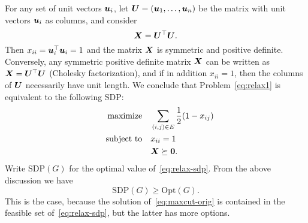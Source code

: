 For any set of unit vectors $\bm{u}_i$, let $\bm{U}=(\bm{u}_1,\dots,\bm{u}_n)$ be the matrix with unit vectors $\bm{u}_i$ as columns, and consider
\begin{equation*}
 \bm{X}=\bm{U}^{\top}\bm{U}.
\end{equation*}
Then $x_{ii}=\bm{u}_i^{\top}\bm{u}_i=1$ and the matrix $\bm{X}$ is symmetric and positive definite.
Conversely, any symmetric positive definite matrix $\bm{X}$ can be written as $\bm{X}=\bm{U}^{\top}\bm{U}$ (Cholesky factorization), and if in addition $x_{ii}=1$, then the columns of $\bm{U}$ necessarily have unit length. We conclude that Problem~\eqref{eq:relax1} is equivalent to the following SDP:
\begin{align}\label{eq:relax-sdp}
\begin{split}
\text{maximize}\quad & \sum_{(i,j)\in E} \frac{1}{2}(1-x_{ij})\\
\quad\text{subject to}\quad & x_{ii}=1\\
& \bm{X}\succeq \bm{0}.
\end{split}
\end{align}
Write $\mathrm{SDP}(G)$ for the optimal value of~\eqref{eq:relax-sdp}. From the above discussion we have
\begin{equation*}
 \mathrm{SDP}(G)\geq \mathrm{Opt}(G).
\end{equation*}
This is the case, because the solution of~\eqref{eq:maxcut-orig} is contained in the feasible set of~\eqref{eq:relax-sdp}, but the latter has more options.

